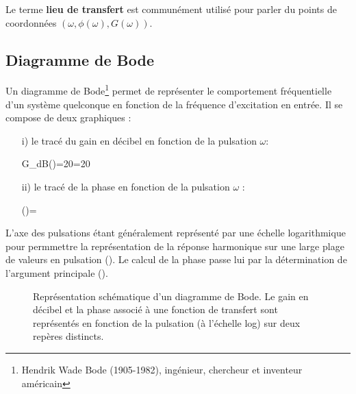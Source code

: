 Le terme \textbf{lieu de transfert} est communément utilisé pour parler du 
points de coordonnées $(\omega, \phi(\omega),G(\omega))$.


\subsection{Diagramme de Bode}

Un diagramme de Bode\footnote{Hendrik Wade Bode 
(1905-1982), ingénieur, chercheur et inventeur américain} permet de 
représenter le comportement fréquentielle d'un système quelconque en fonction 
de la fréquence  d'excitation en entrée. Il se compose de deux graphiques :
\begin{itemize}
    \item[i)] le tracé du gain en décibel en fonction de la pulsation $\omega$:
        \begin{bequation} 
        G_{dB}(\omega)=20=20 
        \end{bequation}
    \item[ii)] le tracé de la phase en fonction de la pulsation $\omega$ :
        \begin{bequation} 
        \phi(\omega)=
        \end{bequation}
\end{itemize}
L'axe des pulsations étant généralement représenté par une échelle 
logarithmique pour permmettre la représentation de la réponse harmonique sur 
une large plage de valeurs en pulsation (). Le calcul de la
phase passe lui par la détermination de l'argument principale 
().

\begin{figure}[!h]
    \centering
    
\caption{Représentation schématique d'un diagramme de Bode. Le gain en 
         décibel et la phase associé à une fonction de transfert sont 
         représentés en fonction de la pulsation (à l'échelle log) sur 
         deux repères distincts.\label{fig-sche_bode}}
\end{figure}


